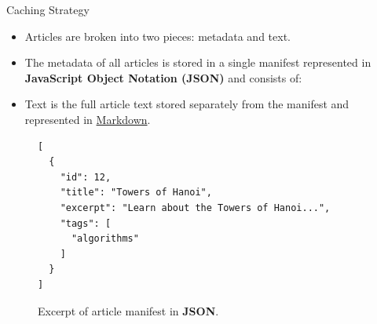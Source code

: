 \documentclass{beamer}
\begin{document}
\begin{frame}{Caching Strategy}
    \begin{itemize}
        \item Articles are broken into two pieces: metadata and text.
        \item The metadata of all articles is stored in a single manifest
            represented in \textbf{JavaScript Object Notation (JSON)} and
            consists of:
        \item Text is the full article text stored separately from the manifest
            and represented in
            \href{https://daringfireball.net/projects/markdown/}{Markdown}.
    \end{itemize}
    \begin{figure}
    \begin{verbatim}
[
  {
    "id": 12,
    "title": "Towers of Hanoi",
    "excerpt": "Learn about the Towers of Hanoi...",
    "tags": [
      "algorithms"
    ]
  }
]
    \end{verbatim}
    \caption{Excerpt of article manifest in \textbf{JSON}.}
    \end{figure}
\end{frame}
\end{document}
